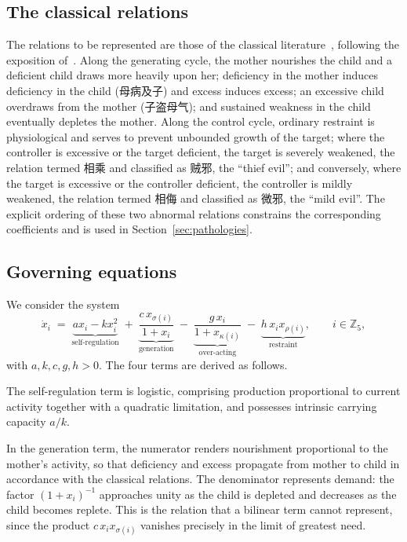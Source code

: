 \documentclass[11pt]{article}
\newcommand{\Z}{{\mathbb{Z}}}
\theoremstyle{definition}
\theoremstyle{remark}
\begin{document}
	\subsection{The classical relations}\label{sec:relations}
	
	The relations to be represented are those of the classical
	literature~\cite{NeiJing}, following the exposition
	of~\cite{Kaptchuk2000,Porkert1990}. Along the generating cycle, the mother nourishes
	the child and a deficient child draws more heavily upon her; deficiency in the
	mother induces deficiency in the child (母病及子) and excess induces excess; an
	excessive child overdraws from the mother (子盗母气); and sustained weakness in
	the child eventually depletes the mother. Along the control cycle, ordinary
	restraint is physiological and serves to prevent unbounded growth of the target;
	where the controller is excessive or the target deficient, the target is severely
	weakened, the relation termed 相乘 and classified as 贼邪, the ``thief
	evil''; and conversely, where the target is excessive or the controller deficient,
	the controller is mildly weakened, the relation termed 相侮 and classified as
	微邪, the ``mild evil''. The explicit ordering of these two abnormal relations
	constrains the corresponding coefficients and is used in
	Section~\ref{sec:pathologies}.
	
	\subsection{Governing equations}
	
	We consider the system
	\begin{equation}\label{eq:sat}
		\dot{x}_i \;=\;
		\underbrace{a x_i - k x_i^2}_{\text{self-regulation}}
		\;+\;\underbrace{\frac{c\,x_{\sigma(i)}}{1+x_i}}_{\text{generation}}
		\;-\;\underbrace{\frac{g\,x_i}{1+x_{\kappa(i)}}}_{\text{over-acting}}
		\;-\;\underbrace{h\,x_i x_{\rho(i)}}_{\text{restraint}},
		\qquad i\in\Z_5 ,
	\end{equation}
	with $a,k,c,g,h>0$. The four terms are derived as follows.
	
	The self-regulation term is logistic, comprising production proportional to current
	activity together with a quadratic limitation, and possesses intrinsic carrying
	capacity $a/k$.
	
	In the generation term, the numerator renders nourishment proportional to the
	mother's activity, so that deficiency and excess propagate from mother to child in
	accordance with the classical relations. The denominator represents demand: the
	factor $(1+x_i)^{-1}$ approaches unity as the child is depleted and decreases as the
	child becomes replete. This is the relation that a bilinear term cannot represent,
	since the product $c\,x_ix_{\sigma(i)}$ vanishes precisely in the limit of greatest
	need.
	
\end{document}
